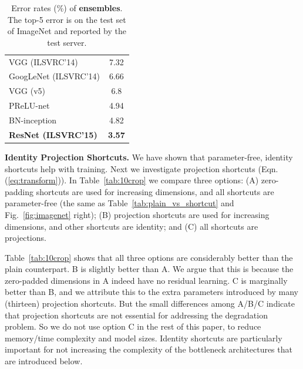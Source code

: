 \documentclass[10pt,twocolumn,letterpaper]{article}
\begin{document}
\begin{table}[t]
\begin{center}
\begin{tabular}{l|c}
      \hline
      VGG \cite{Simonyan2015} (ILSVRC'14)        & 7.32                       \\
      GoogLeNet \cite{Szegedy2015} (ILSVRC'14)   & 6.66                       \\
      \hline
      VGG \cite{Simonyan2015} \footnotesize (v5) & 6.8                        \\
      PReLU-net \cite{He2015}                    & 4.94                       \\
      BN-inception \cite{Ioffe2015}              & 4.82                       \\\hline
      \textbf{ResNet (ILSVRC'15)}                & \textbf{3.57}              \\
      \hline
    \end{tabular}
  \end{center}
  \vspace{-.5em}
  \caption{Error rates (\%) of \textbf{ensembles}. The top-5 error is on the test set of ImageNet and reported by the test server.}
  \label{tab:ensemble}
\end{table}

\vspace{6pt}
\noindent\textbf{Identity \vs Projection Shortcuts.}
We have shown that parameter-free, identity shortcuts help with training. Next we investigate projection shortcuts (Eqn.(\ref{eq:transform})).
In Table~\ref{tab:10crop} we compare three options: (A) zero-padding shortcuts are used for increasing dimensions, and all shortcuts are parameter-free (the same as Table~\ref{tab:plain_vs_shortcut} and Fig.~\ref{fig:imagenet} right); (B) projection shortcuts are used for increasing dimensions, and other shortcuts are identity; and (C) all shortcuts are projections.

Table~\ref{tab:10crop} shows that all three options are considerably better than the plain counterpart.
B is slightly better than A. We argue that this is because the zero-padded dimensions in A indeed have no residual learning. C is marginally better than B, and we attribute this to the extra parameters introduced by many (thirteen) projection shortcuts. But the small differences among A/B/C indicate that projection shortcuts are not essential for addressing the degradation problem. So we do not use option C in the rest of this paper, to reduce memory/time complexity and model sizes. Identity shortcuts are particularly important for not increasing the complexity of the bottleneck architectures that are introduced below.
\end{document}
